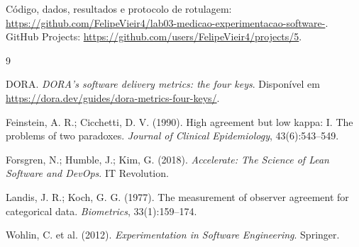 \documentclass[12pt]{article}
\begin{document}
Código, dados, resultados e protocolo de rotulagem: \url{https://github.com/FelipeVieir4/lab03-medicao-experimentacao-software-}. GitHub Projects: \url{https://github.com/users/FelipeVieir4/projects/5}.

\begin{thebibliography}{9}

DORA. \textit{DORA's software delivery metrics: the four keys}. Disponível em \url{https://dora.dev/guides/dora-metrics-four-keys/}.

Feinstein, A. R.; Cicchetti, D. V. (1990). High agreement but low kappa: I. The problems of two paradoxes. \textit{Journal of Clinical Epidemiology}, 43(6):543--549.

Forsgren, N.; Humble, J.; Kim, G. (2018). \textit{Accelerate: The Science of Lean Software and DevOps}. IT Revolution.

Landis, J. R.; Koch, G. G. (1977). The measurement of observer agreement for categorical data. \textit{Biometrics}, 33(1):159--174.

Wohlin, C. et al. (2012). \textit{Experimentation in Software Engineering}. Springer.

\end{thebibliography}
\end{document}
